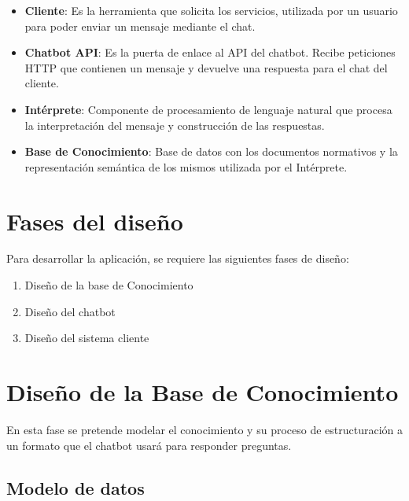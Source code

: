 \begin{itemize}
    \item \textbf{Cliente}: Es la herramienta que solicita los servicios, utilizada por un usuario para poder enviar un mensaje mediante el chat.
    \item \textbf{Chatbot API}: Es la puerta de enlace al API del chatbot. Recibe peticiones HTTP que contienen un mensaje y devuelve una respuesta para el chat del cliente.
    \item \textbf{Intérprete}: Componente de procesamiento de lenguaje natural que procesa la interpretación del mensaje y construcción de las respuestas.
    \item \textbf{Base de Conocimiento}: Base de datos con los documentos normativos y la representación semántica de los mismos utilizada por el Intérprete.
\end{itemize}

\section{Fases del diseño}

Para desarrollar la aplicación, se requiere las siguientes fases de diseño:

\begin{enumerate}
    \item Diseño de la base de Conocimiento
    \item Diseño del chatbot
    \item Diseño del sistema cliente
\end{enumerate}



%
%
%
%


\section{Diseño de la Base de Conocimiento}

En esta fase se pretende modelar el conocimiento y su proceso de estructuración a un formato que el chatbot usará para responder preguntas.

\subsection{Modelo de datos}

